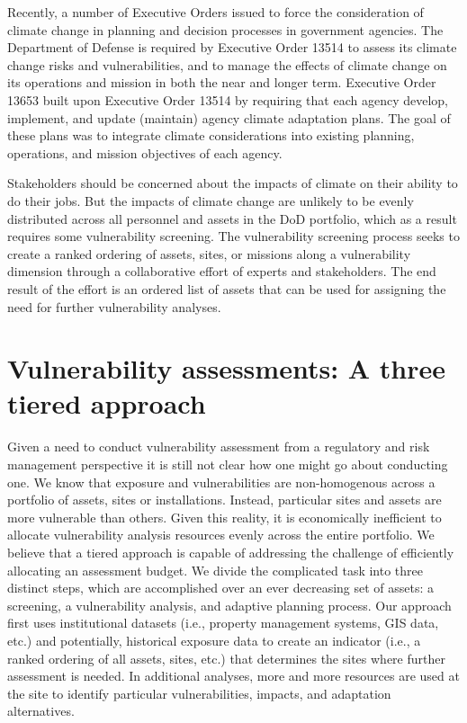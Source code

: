 \documentclass[10pt]{amsart}
\begin{document}
Recently, a number of Executive Orders issued to force the consideration of climate change in planning and decision processes in government agencies. 
The Department of Defense is required by Executive Order 13514 to assess its climate change risks and vulnerabilities, and to manage the effects of climate change on its operations and mission in both the near and longer term. 
Executive Order 13653 built upon Executive Order 13514 by requiring that each agency develop, implement, and update (maintain) agency climate adaptation plans.
The goal of these plans was to integrate climate considerations into existing planning, operations, and mission objectives of each agency.

Stakeholders should be concerned about the impacts of climate on their ability to do their jobs. 
But the impacts of climate change are unlikely to be evenly distributed across all personnel and assets in the DoD portfolio, which as a result requires some vulnerability screening.
The vulnerability screening process seeks to create a ranked ordering of assets, sites, or missions along a vulnerability dimension through a collaborative effort of experts and stakeholders.
The end result of the effort is an ordered list of assets that can be used for assigning the need for further vulnerability analyses. 

\section{Vulnerability assessments: A three tiered approach}
Given a need to conduct vulnerability assessment from a regulatory and risk management perspective it is still not clear how one might go about conducting one.
We know that exposure and vulnerabilities are non-homogenous across a portfolio of assets, sites or installations. 
Instead, particular sites and assets are more vulnerable than others.
Given this reality, it is economically inefficient to allocate vulnerability analysis resources evenly across the entire portfolio.
We believe that a tiered approach is capable of addressing the challenge of efficiently allocating an assessment budget.
We divide the complicated task into three distinct steps, which are accomplished over an ever decreasing set of assets: a screening, a vulnerability analysis, and adaptive planning process. 
Our approach first uses institutional datasets (i.e., property management systems, GIS data, etc.) and potentially, historical exposure data to create an indicator (i.e., a ranked ordering of all assets, sites, etc.) that determines the sites where further assessment is needed. 
In additional analyses, more and more resources are used at the site to identify particular vulnerabilities, impacts, and adaptation alternatives. 
\end{document}
